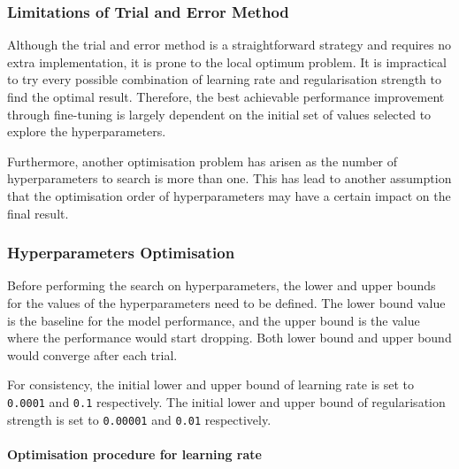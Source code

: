 \documentclass[11pt]{article}
\begin{document}
\hypertarget{limitations-of-trial-and-error-method}{%
\subsubsection{Limitations of Trial and Error
Method}\label{limitations-of-trial-and-error-method}}

Although the trial and error method is a straightforward strategy and
requires no extra implementation, it is prone to the local optimum
problem. It is impractical to try every possible combination of learning
rate and regularisation strength to find the optimal result. Therefore,
the best achievable performance improvement through fine-tuning is
largely dependent on the initial set of values selected to explore the
hyperparameters.

Furthermore, another optimisation problem has arisen as the number of
hyperparameters to search is more than one. This has lead to another
assumption that the optimisation order of hyperparameters may have a
certain impact on the final result.

\hypertarget{hyperparameters-optimisation}{%
\subsubsection{Hyperparameters
Optimisation}\label{hyperparameters-optimisation}}

Before performing the search on hyperparameters, the lower and upper
bounds for the values of the hyperparameters need to be defined. The
lower bound value is the baseline for the model performance, and the
upper bound is the value where the performance would start dropping.
Both lower bound and upper bound would converge after each trial.

For consistency, the initial lower and upper bound of learning rate is
set to \texttt{0.0001} and \texttt{0.1} respectively. The initial lower
and upper bound of regularisation strength is set to \texttt{0.00001}
and \texttt{0.01} respectively.

\hypertarget{optimisation-procedure-for-learning-rate}{%
\paragraph{Optimisation procedure for learning
rate}\label{optimisation-procedure-for-learning-rate}}
\end{document}
